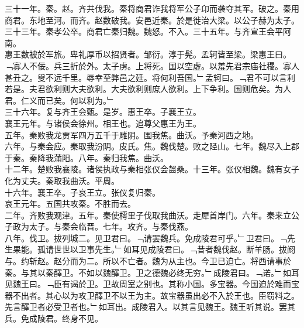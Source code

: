 \documentclass{zhvt-classic}
\begin{document}
\hspace*{2em}三十一年。秦。赵。齐共伐我。秦将商君诈我将军公子卬而袭夺其军。破之。秦用商君。东地至河。而齐。赵数破我。安邑近秦。於是徙治大梁。以公子赫为太子。\\
\hspace*{2em}三十三年。秦孝公卒。商君亡秦归魏。魏怒。不入。三十五年。与齐宣王会平阿南。\\
\hspace*{2em}惠王数被於军旅。卑礼厚币以招贤者。邹衍。淳于髡。孟轲皆至梁。梁惠王曰。﹁寡人不佞。兵三折於外。太子虏。上将死。国以空虚。以羞先君宗庙社稷。寡人甚丑之。叟不远千里。辱幸至弊邑之廷。将何利吾国。﹂孟轲曰。﹁君不可以言利若是。夫君欲利则大夫欲利。大夫欲利则庶人欲利。上下争利。国则危矣。为人君。仁义而已矣。何以利为。﹂\\
\hspace*{2em}三十六年。复与齐王会甄。是岁。惠王卒。子襄王立。\\
\hspace*{2em}襄王元年。与诸侯会徐州。相王也。追尊父惠王为王。\\
\hspace*{2em}五年。秦败我龙贾军四万五千于雕阴。围我焦。曲沃。予秦河西之地。\\
\hspace*{2em}六年。与秦会应。秦取我汾阴。皮氏。焦。魏伐楚。败之陉山。七年。魏尽入上郡于秦。秦降我蒲阳。八年。秦归我焦。曲沃。\\
\hspace*{2em}十二年。楚败我襄陵。诸侯执政与秦相张仪会齧桑。十三年。张仪相魏。魏有女子化为丈夫。秦取我曲沃。平周。\\
\hspace*{2em}十六年。襄王卒。子哀王立。张仪复归秦。\\
\hspace*{2em}哀王元年。五国共攻秦。不胜而去。\\
\hspace*{2em}二年。齐败我观津。五年。秦使樗里子伐取我曲沃。走犀首岸门。六年。秦来立公子政为太子。与秦会临晋。七年。攻齐。与秦伐燕。\\
\hspace*{2em}八年。伐卫。拔列城二。见卫君曰。﹁请罢魏兵。免成陵君可乎。﹂卫君曰。﹁先生果能。孤请世世以卫事先生。﹂如耳见成陵君曰。﹁昔者魏伐赵。断羊肠。拔阏与。约斩赵。赵分而为二。所以不亡者。魏为从主也。今卫已迫亡。将西请事於秦。与其以秦醳卫。不如以魏醳卫。卫之德魏必终无穷。﹂成陵君曰。﹁诺。﹂如耳见魏王曰。﹁臣有谒於卫。卫故周室之别也。其称小国。多宝器。今国迫於难而宝器不出者。其心以为攻卫醳卫不以王为主。故宝器虽出必不入於王也。臣窃料之。先言醳卫者必受卫者也。﹂如耳出。成陵君入。以其言见魏王。魏王听其说。罢其兵。免成陵君。终身不见。\\
\end{document}

